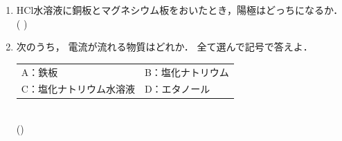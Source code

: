 \documentclass[fontsize=15pt]{jlreq}
\begin{document}
\begin{enumerate}
    \item $\mathrm{HCl}$水溶液に銅板とマグネシウム板をおいたとき，陽極はどっちになるか．\\
    ( \hspace{3cm} ) 
    \vspace{2em} 

    \item 次のうち，
    電流が流れる物質はどれか．
    全て選んで記号で答えよ．\\
    \begin{tabular}{ll}
      A：鉄板 & B：塩化ナトリウム \\
      C：塩化ナトリウム水溶液 & D：エタノール \\
    \end{tabular} \\
    (\hspace{4cm})

\end{enumerate}
\end{document}
